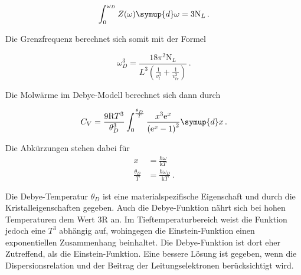 \begin{equation*}
  \int_0^{\omega_D} Z(\omega) \symup{d} \omega = 3 \text{N}_L \, .
  \label{eqn:int}
\end{equation*}

Die Grenzfrequenz berechnet sich somit mit der Formel

\begin{equation}
  \omega_D^3 = \frac{18 \pi^2 \text{N}_L}{L^3 \left(\frac{1}{v_l^3} + \frac{1}{v_{tr}^3} \right)} \, .
  \label{eqn:omega}
\end{equation}

Die Molwärme im Debye-Modell berechnet sich dann durch

\begin{equation}
  C_V = \frac{9 \text{R} T^3}{\theta_D^3} \int_0^{\frac{\theta_D}{T}}
  \frac{x^3 \mathrm{e}^x} {\left(\mathrm{e}^x -1 \right)^2} \symup{d} x \, .
  \label{eqn:debye}
\end{equation}

Die Abkürzungen stehen dabei für
\begin{align*}
  x &= \frac{\hbar \omega}{\text{k} T} \\
  \frac{\theta_D}{T} &= \frac{\hbar \omega_D}{\text{k} T} \, .
\end{align*}

Die Debye-Temperatur $\theta_D$ ist eine materialspezifische Eigenschaft und
durch die Kristalleigenschaften gegeben. Auch die Debye-Funktion nährt sich
bei hohen Temperaturen dem Wert $3 \text{R}$ an. Im Tieftemperaturbereich
weist die Funktion jedoch eine $T^3$ abhängig auf, wohingegen die
Einstein-Funktion einen exponentiellen Zusammenhang beinhaltet. Die
Debye-Funktion ist dort eher Zutreffend, als die Einstein-Funktion. Eine bessere
Lösung ist gegeben, wenn die Dispersionsrelation und der Beitrag der
Leitungselektronen berücksichtigt wird.
